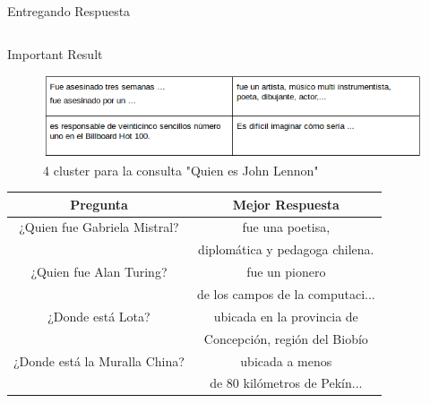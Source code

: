 \documentclass[final]{beamer}
\newlength{\onecolwid}
\newlength{\twocolwid}
\begin{document}
\begin{frame}[t]
\begin{columns}[t]
\begin{column}{\twocolwid}
\begin{columns}[t,totalwidth=\twocolwid]
\begin{column}{\onecolwid}
\begin{block}{Entregando Respuesta}
\end{block}


\end{column} %

\end{columns} %


\begin{alertblock}{Important Result}
\begin{figure}
\centering
\includegraphics[scale=1.7]{img/clusters.png} 
\caption{4 cluster para la consulta "Quien es John Lennon"}
\end{figure}

\begin{center}
\begin{tabular}{|c|c|}
\hline 
\textbf{Pregunta} & \textbf{Mejor Respuesta} \\ 
\hline 
¿Quien fue Gabriela Mistral? & fue una poetisa, \\&diplomática y pedagoga chilena. \\ 
\hline 
¿Quien fue Alan Turing? & fue un pionero \\&de los campos de la computaci... \\ 
\hline 
¿Donde está Lota? & ubicada en la provincia de \\&Concepción, región del Biobío \\ 
\hline 
¿Donde está la Muralla China? & ubicada a menos \\&de 80 kilómetros de Pekín... \\ 
\hline 
\end{tabular} 
\end{center}
\end{alertblock} 



\end{column}
\end{columns}
\end{frame}
\end{document}
